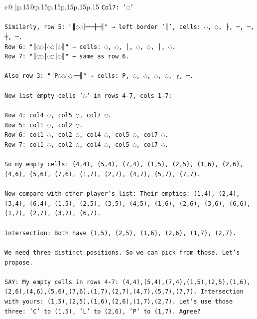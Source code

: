 \documentclass{article}
\begin{document}
{\begin{supertabular}{c@{$\;$}|p{.15\linewidth}@{}p{.15\linewidth}p{.15\linewidth}p{.15\linewidth}p{.15\linewidth}p{.15\linewidth}}
{{{\texttt{Col7: '◌'} \\
\\ 
\texttt{Similarly, row 5: "║◌◌├──┼─╢" → left border '║', cells: ◌, ◌, ├, ─, ─, ┼, ─.} \\
\texttt{Row 6: "║◌◌│◌◌│◌║" → cells: ◌, ◌, │, ◌, ◌, │, ◌.} \\
\texttt{Row 7: "║◌◌│◌◌│◌║" → same as row 6.} \\
\\ 
\texttt{Also row 3: "║P◌◌◌◌┌─╢" → cells: P, ◌, ◌, ◌, ◌, ┌, ─.} \\
\\ 
\texttt{Now list empty cells '◌' in rows 4{-}7, cols 1{-}7:} \\
\\ 
\texttt{Row 4: col4 ◌, col5 ◌, col7 ◌.} \\
\texttt{Row 5: col1 ◌, col2 ◌.} \\
\texttt{Row 6: col1 ◌, col2 ◌, col4 ◌, col5 ◌, col7 ◌.} \\
\texttt{Row 7: col1 ◌, col2 ◌, col4 ◌, col5 ◌, col7 ◌.} \\
\\ 
\texttt{So my empty cells: (4,4), (5,4), (7,4), (1,5), (2,5), (1,6), (2,6), (4,6), (5,6), (7,6), (1,7), (2,7), (4,7), (5,7), (7,7).} \\
\\ 
\texttt{Now compare with other player's list: Their empties: (1,4), (2,4), (3,4), (6,4), (1,5), (2,5), (3,5), (4,5), (1,6), (2,6), (3,6), (6,6), (1,7), (2,7), (3,7), (6,7).} \\
\\ 
\texttt{Intersection: Both have (1,5), (2,5), (1,6), (2,6), (1,7), (2,7).} \\
\\ 
\texttt{We need three distinct positions. So we can pick from those. Let's propose.} \\
\\ 
\texttt{SAY: My empty cells in rows 4{-}7: (4,4),(5,4),(7,4),(1,5),(2,5),(1,6),(2,6),(4,6),(5,6),(7,6),(1,7),(2,7),(4,7),(5,7),(7,7). Intersection with yours: (1,5),(2,5),(1,6),(2,6),(1,7),(2,7). Let's use those three: 'C' to (1,5), 'L' to (2,6), 'P' to (1,7). Agree?} \\
            }
        }
    }
     \\ \\


\end{supertabular}}
\end{document}
